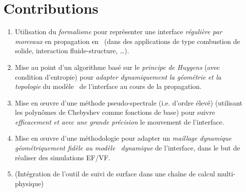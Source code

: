 \section*{Contributions}

\begin{enumerate}
	\item Utilisation du \emph{formalisme \brep} pour représenter une interface \textit{régulière par morceaux} en propagation en \troisD\ (dans des applications de type combustion de solide, interaction fluide-structure, \ldots).
	
	\item Mise au point d’un algorithme basé sur le \emph{principe de Huygens} (avec condition d’entropie) pour \emph{adapter dynamiquement la géométrie et la topologie} du modèle \brep\ de l’interface au cours de la propagation.
	
	\item Mise en \oe uvre d’une méthode pseudo-spectrale (i.e. d’ordre élevé) (utilisant les polynômes de Chebyshev comme fonctions de base) pour suivre \emph{efficacement et avec une grande précision} le mouvement de l’interface.
	
	\item Mise en œuvre d’une méthodologie pour adapter un \emph{maillage dynamique géométriquement fidèle au modèle \brep\ dynamique} de l’interface, dans le but de réaliser des simulations EF/VF.
	
	\item (Intégration de l'outil de suivi de surface dans une chaîne de calcul multi-physique)
\end{enumerate}



